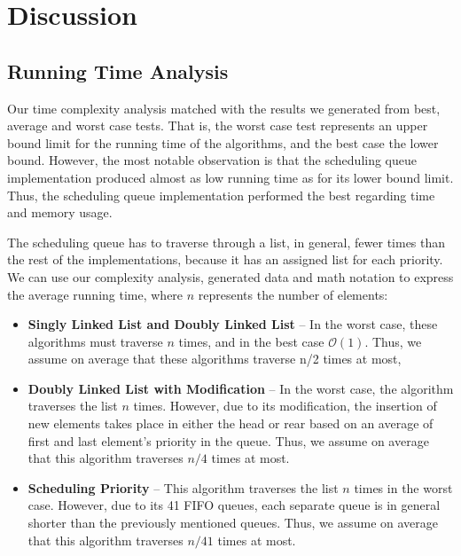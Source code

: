 \documentclass[a4paper,11pt]{kth-mag}
\newcommand*{\skippara}{\par\vspace{\baselineskip} \noindent}
\begin{document}
\section{Discussion}

\subsection{Running Time Analysis}\label{sec:rtanal}
Our time complexity analysis matched with the results we generated from best, average and worst case tests.
That is, the worst case test represents an upper bound limit for the running time of the algorithms, and the best case the lower bound.
However, the most notable observation is that the scheduling queue implementation produced almost as low running time as for its lower bound limit.
Thus, the scheduling queue implementation performed the best regarding time and memory usage.

\skippara The scheduling queue has to traverse through a list, in general, fewer times than the rest of the implementations, because it has an assigned list for each priority.
We can use our complexity analysis, generated data and math notation to express the average running time, where $n$ represents the number of elements:
\begin{itemize}
    \item \textbf{Singly Linked List and Doubly Linked List} --
        In the worst case, these algorithms must traverse $n$ times, and in the best case $\mathcal{O}(1)$.
        Thus, we assume on average that these algorithms traverse n/2 times at most,
    \item \textbf{Doubly Linked List with Modification} --
        In the worst case, the algorithm traverses the list $n$ times.
        However, due to its modification, the insertion of new elements takes place in either the head or rear based on an average of first and last element's priority in the queue.
        Thus, we assume on average that this algorithm traverses $n/4$ times at most.
    \item \textbf{Scheduling Priority} --
        This algorithm traverses the list $n$ times in the worst case.
        However, due to its 41 FIFO queues, each separate queue is in general shorter than the previously mentioned queues.
        Thus, we assume on average that this algorithm traverses $n/41$ times at most.

\end{itemize}
\end{document}
